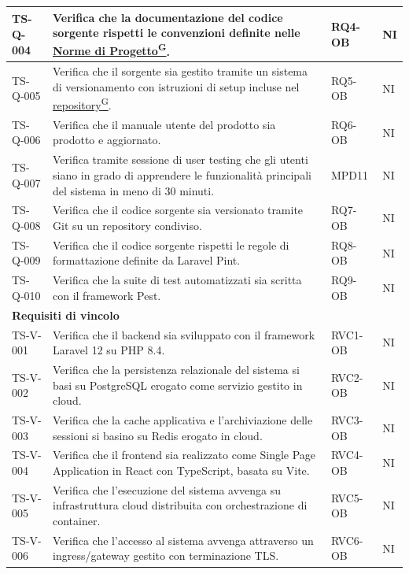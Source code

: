 \documentclass[a4paper,12pt]{article}
\providecommand{\glslink}[2]{\href{https://alittlebyte-19.github.io/Documentazione/glossario.html\#gls-#1}{\underline{#2}\textsuperscript{\scriptsize G}}}
\begin{document}
\begin{longtable}{|p{2.2cm}|p{9.5cm}|p{2.3cm}|p{1.5cm}|}
    \hline
    TS-Q-004 & Verifica che la documentazione del codice sorgente rispetti le convenzioni definite nelle \glslink{norme-di-progetto}{Norme di Progetto}. & RQ4-OB & NI \\
    \hline
    TS-Q-005 & Verifica che il sorgente sia gestito tramite un sistema di versionamento con istruzioni di setup incluse nel \glslink{repository}{repository}. & RQ5-OB & NI \\
    \hline
    TS-Q-006 & Verifica che il manuale utente del prodotto sia prodotto e aggiornato. & RQ6-OB & NI \\
    \hline
    TS-Q-007 & Verifica tramite sessione di user testing che gli utenti siano in grado di apprendere le funzionalità principali del sistema in meno di 30 minuti. & MPD11 & NI \\
    \hline
    TS-Q-008 & Verifica che il codice sorgente sia versionato tramite Git su un repository condiviso. & RQ7-OB & NI \\
    \hline
    TS-Q-009 & Verifica che il codice sorgente rispetti le regole di formattazione definite da Laravel Pint. & RQ8-OB & NI \\
    \hline
    TS-Q-010 & Verifica che la suite di test automatizzati sia scritta con il framework Pest. & RQ9-OB & NI \\
    \hline
    \multicolumn{4}{|l|}{\cellcolor{gray!12}\textbf{Requisiti di vincolo}} \\
    \hline
    TS-V-001 & Verifica che il backend sia sviluppato con il framework Laravel 12 su PHP 8.4. & RVC1-OB & NI \\
    \hline
    TS-V-002 & Verifica che la persistenza relazionale del sistema si basi su PostgreSQL erogato come servizio gestito in cloud. & RVC2-OB & NI \\
    \hline
    TS-V-003 & Verifica che la cache applicativa e l'archiviazione delle sessioni si basino su Redis erogato in cloud. & RVC3-OB & NI \\
    \hline
    TS-V-004 & Verifica che il frontend sia realizzato come Single Page Application in React con TypeScript, basata su Vite. & RVC4-OB & NI \\
    \hline
    TS-V-005 & Verifica che l'esecuzione del sistema avvenga su infrastruttura cloud distribuita con orchestrazione di container. & RVC5-OB & NI \\
    \hline
    TS-V-006 & Verifica che l'accesso al sistema avvenga attraverso un ingress/gateway gestito con terminazione TLS. & RVC6-OB & NI \\
    \hline

\end{longtable}
\end{document}
